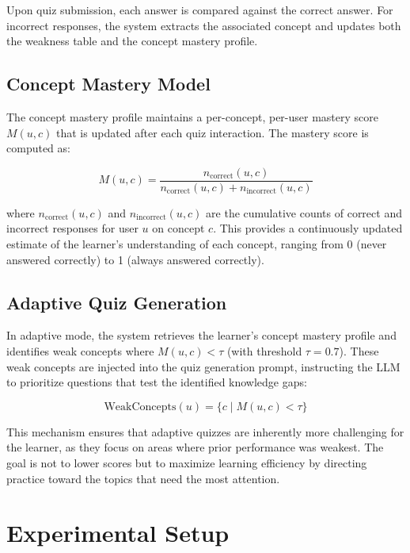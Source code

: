 \documentclass[runningheads]{llncs}
\begin{document}
Upon quiz submission, each answer is compared against the correct answer. For incorrect responses, the system extracts the associated concept and updates both the weakness table and the concept mastery profile.

\subsection{Concept Mastery Model}

The concept mastery profile maintains a per-concept, per-user mastery score $M(u, c)$ that is updated after each quiz interaction. The mastery score is computed as:

\begin{equation}
M(u, c) = \frac{n_{\text{correct}}(u, c)}{n_{\text{correct}}(u, c) + n_{\text{incorrect}}(u, c)}
\label{eq:mastery}
\end{equation}

where $n_{\text{correct}}(u, c)$ and $n_{\text{incorrect}}(u, c)$ are the cumulative counts of correct and incorrect responses for user $u$ on concept $c$. This provides a continuously updated estimate of the learner's understanding of each concept, ranging from 0 (never answered correctly) to 1 (always answered correctly).

\subsection{Adaptive Quiz Generation}

In adaptive mode, the system retrieves the learner's concept mastery profile and identifies weak concepts where $M(u, c) < \tau$ (with threshold $\tau = 0.7$). These weak concepts are injected into the quiz generation prompt, instructing the LLM to prioritize questions that test the identified knowledge gaps:

\begin{equation}
\text{WeakConcepts}(u) = \{c \mid M(u, c) < \tau\}
\label{eq:weak}
\end{equation}

This mechanism ensures that adaptive quizzes are inherently more challenging for the learner, as they focus on areas where prior performance was weakest. The goal is not to lower scores but to maximize learning efficiency by directing practice toward the topics that need the most attention.

\section{Experimental Setup}
\end{document}
